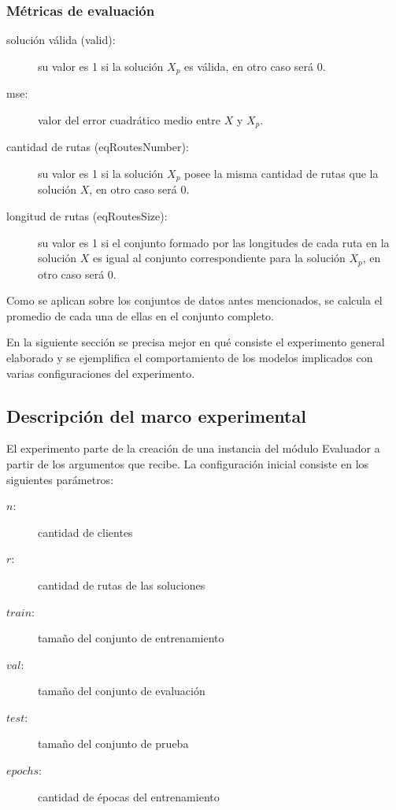 \subsubsection{Métricas de evaluación}
\begin{description}
	\item[solución válida (valid): ] su valor es 1 si la solución $X_p$ es válida, en otro caso será 0.
	
	\item[mse:] valor del error cuadrático medio entre $X$ y $X_p$.
	
	\item[cantidad de rutas (eqRoutesNumber): ] su valor es 1 si la solución $X_p$ posee la misma cantidad de rutas que la solución $X$, en otro caso será 0.
	
	\item[longitud de rutas (eqRoutesSize): ] su valor es 1 si el conjunto formado por las longitudes de cada ruta en la solución $X$ es igual al conjunto correspondiente para la solución $X_p$, en otro caso será 0.
	
	
\end{description}

Como se aplican sobre los conjuntos de datos antes mencionados, se calcula el promedio de cada una de ellas en el conjunto completo. 

En la siguiente sección se precisa mejor en qué consiste el experimento general elaborado y se ejemplifica el comportamiento de los modelos implicados con varias configuraciones del experimento.

\subsection{Descripción del marco experimental}

El experimento parte de la creación de una instancia del módulo Evaluador a partir de los argumentos que recibe. La configuración inicial consiste en los siguientes parámetros:
\begin{description}
	\item[\textbf{$n$}:] cantidad de clientes 
	\item[\textbf{$r$}:] cantidad de rutas de las soluciones 
	\item[\textbf{$train$}:] tamaño del conjunto de entrenamiento
	\item[\textbf{$val$}: ] tamaño del conjunto de evaluación
	\item[\textbf{$test$}:] tamaño del conjunto de prueba
	\item[\textbf{$epochs$}:] cantidad de épocas del entrenamiento
\end{description}

